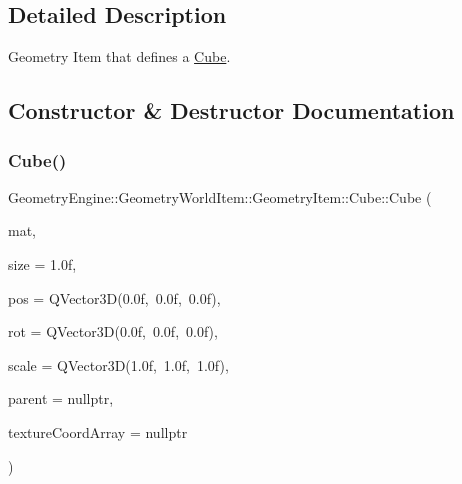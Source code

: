 \subsection{Detailed Description}
Geometry Item that defines a \mbox{\hyperlink{class_geometry_engine_1_1_geometry_world_item_1_1_geometry_item_1_1_cube}{Cube}}. 

\subsection{Constructor \& Destructor Documentation}
\mbox{\label{class_geometry_engine_1_1_geometry_world_item_1_1_geometry_item_1_1_cube_a17e32e15517c004eaaf5187d8c6bce4e}} 
\subsubsection{\texorpdfstring{Cube()}{Cube()}\hspace{0.1cm}{\footnotesize\ttfamily [1/2]}}
{\footnotesize\ttfamily Geometry\+Engine\+::\+Geometry\+World\+Item\+::\+Geometry\+Item\+::\+Cube\+::\+Cube (\begin{DoxyParamCaption}\item[{const \mbox{\hyperlink{class_geometry_engine_1_1_geometry_material_1_1_material}{Geometry\+Material\+::\+Material}} \&}]{mat,  }\item[{float}]{size = {\ttfamily 1.0f},  }\item[{const Q\+Vector3D \&}]{pos = {\ttfamily QVector3D(0.0f,~0.0f,~0.0f)},  }\item[{const Q\+Vector3D \&}]{rot = {\ttfamily QVector3D(0.0f,~0.0f,~0.0f)},  }\item[{const Q\+Vector3D \&}]{scale = {\ttfamily QVector3D(1.0f,~1.0f,~1.0f)},  }\item[{\mbox{\hyperlink{class_geometry_engine_1_1_geometry_world_item_1_1_world_item}{World\+Item}} $\ast$}]{parent = {\ttfamily nullptr},  }\item[{std\+::vector$<$ Q\+Vector2D $>$ $\ast$}]{texture\+Coord\+Array = {\ttfamily nullptr} }\end{DoxyParamCaption})}

